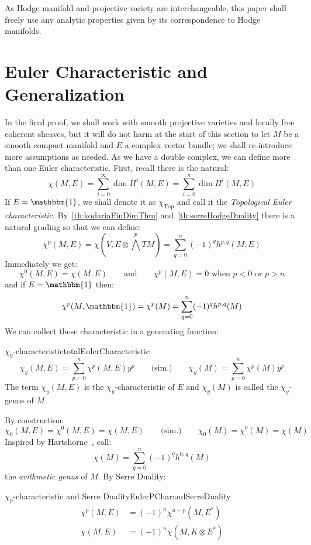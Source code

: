 \documentclass{ut-thesis}
\newenvironment{Proof}[1][]
  {\begin{ProofTcb}[#1]}
  {\end{ProofTcb}}
\newcommand{\Top}{{\operatorname{Top}}}
\begin{document}
\begin{Proof}
 \cite[p.141]{hirzebruchTopologicalMethodsAlgebraic1995}
\end{Proof}


As Hodge manifold and projective variety are interchangeable, this paper shall freely use any analytic
properties given by its correspondence to Hodge manifolds.

\section{Euler Characteristic and Generalization}\label{sec:eulerCharAndGeneralization}

In the final proof, we shall work with smooth projective varieties and locally free coherent sheaves, but it
will do not harm at the start of this section to let $M$ be a smooth compact manifold and $E$ a complex vector
bundle; we shall re-introduce more assumptions as needed. As we have a double complex, we can define more than
one Euler characteristic. First, recall there is the natural:
\[
  \chi(M,E) = \sum_{i=0}^\infty \dim H^i(M,E) = \sum_{i=0}^n \dim H^i(M,E)
\]
If $E = \mathbbm{1}$, we shall denote it as $\chi_\Top$ and call it the \emph{Topological Euler
characteristic}. By~\cref{th:kodariaFinDimThm} and~\cref{th:serreHodgeDuality} there is a natural grading so
that we can define:
\[
  \chi^p(M,E) = \chi\left(V, E\otimes \bigwedge^p TM\right) = \sum_{q=0}^n (-1)^q h^{p,q}(M,E)
\]
Immediately we get:
\[
  \chi^0(M,E) = \chi(M,E) \qquad \text{and} \qquad \chi^p(M,E) = 0\text{ when $p < 0$ or $p > n$}
\]
and if $E = \mathbbm{1}$ then:
\[
  \chi^p(M,\mathbbm{1}) = \chi^p(M) = \sum_{q=0}^n (-1)^q h^{p,q}(M)
\]
We can collect these characteristic in a generating function:
\begin{defn}{$\chi_y$-characteristic}{totalEulerCharacteristic}
    \[
    \chi_y(M,E) = \sum_{p=0}^n \chi^p(M,E)y^p \qquad \text{(sim.)} \qquad \chi_y(M) = \sum_{p=0}^n \chi^p(M)y^p
  \]
  The term $\chi_y(M,E)$ is the $\chi_y$-characteristic of $E$ and $\chi_y(M)$ is called the $\chi_y$-genus of
  $M$
\end{defn}

By construction:
\[
  \chi_0(M,E) = \chi^0(M,E) = \chi(M,E) \qquad \text{(sim.)} \qquad \chi_0(M) = \chi^0(M) = \chi(M)
\]
Inspired by Hartshorne~\cite{hartshorneAlgebraicGeometry2013}, call:
\[
  \chi(M) = \sum_{q=0}^n (-1)^q h^{0,q}(M)
\]
the \emph{arithmetic genus} of $M$. By Serre Duality:
\begin{prop}{$\chi_p$-characteristic and Serre Duality}{EulerPCharandSerreDuality}
  \begin{align*}
  \chi^p(M,E) &= (-1)^n \chi^{n-p}(M, E^*)\\
  \chi(M,E)&= (-1)^n \chi(M, K\otimes E^*)
\end{align*}
\end{prop}
\end{document}
